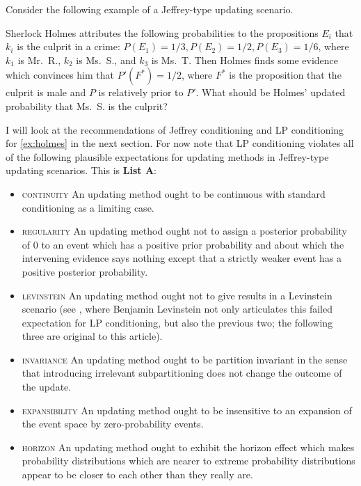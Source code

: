 \documentclass[12pt]{article}
\begin{document}
Consider the following example of a Jeffrey-type updating scenario.

\begin{example}[Holmes]
  \label{ex:holmes}
  Sherlock Holmes attributes the following probabilities to the
  propositions $E_{i}$ that $k_{i}$ is the culprit in a crime:
  $P(E_{1})=1/3,P(E_{2})=1/2,P(E_{3})=1/6$, where $k_{1}$ is Mr.\ R.,
  $k_{2}$ is Ms.\ S., and $k_{3}$ is Ms.\ T. Then Holmes finds some
  evidence which convinces him that $P'(F^{*})=1/2$, where $F^{*}$ is
  the proposition that the culprit is male and $P$ is relatively prior
  to $P'$. What should be Holmes' updated probability that Ms.\ S. is
  the culprit?
\end{example}

I will look at the recommendations of Jeffrey conditioning and LP
conditioning for {\xample} \ref{ex:holmes} in the next section. For
now note that LP conditioning violates all of the following plausible
expectations for updating methods in Jeffrey-type updating scenarios.
This is \textbf{List A}:

\begin{itemize}
\item \textsc{continuity} An updating method ought to be continuous with
  standard conditioning as a limiting case.
\item \textsc{regularity} An updating method ought not to assign a posterior
  probability of $0$ to an event which has a positive prior
  probability and about which the intervening evidence says nothing
  except that a strictly weaker event has a positive posterior
  probability.
\item \textsc{levinstein} An updating method ought not to give
   results in a Levinstein scenario (see
  , where Benjamin Levinstein not only
  articulates this failed expectation for LP conditioning, but also
  the previous two; the following three are original to this article).
\item \textsc{invariance} An updating method ought to be partition
  invariant in the sense that introducing irrelevant subpartitioning
  does not change the outcome of the update.
\item \textsc{expansibility} An updating method ought to be insensitive to an
  expansion of the event space by zero-probability events.
\item \textsc{horizon} An updating method ought to exhibit the horizon effect
  which makes probability distributions which are nearer to extreme
  probability distributions appear to be closer to each other than
  they really are.
\end{itemize}
\end{document}
